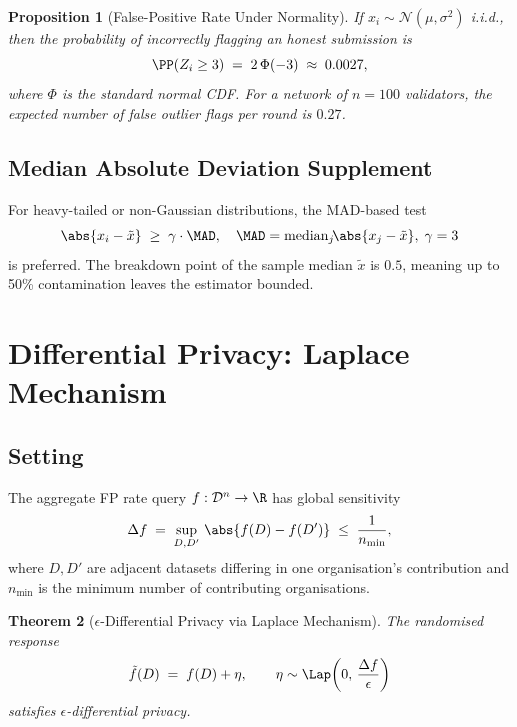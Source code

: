 \documentclass[12pt,a4paper]{article}
\newtheorem{theorem}{Theorem}[section]
\newtheorem{proposition}[theorem]{Proposition}
\theoremstyle{definition}
\theoremstyle{remark}
\begin{document}
\begin{proposition}[False-Positive Rate Under Normality]
If $x_i \sim \mathcal{N}(\mu,\sigma^2)$ i.i.d., then the probability of incorrectly
flagging an honest submission is
\[
  \PP(Z_i \ge 3) \;=\; 2\,\Phi(-3) \;\approx\; 0.0027,
\]
where $\Phi$ is the standard normal CDF.  For a network of $n=100$ validators,
the expected number of false outlier flags per round is $0.27$.
\end{proposition}

\subsection{Median Absolute Deviation Supplement}

For heavy-tailed or non-Gaussian distributions, the MAD-based test
\begin{equation}
  \abs{x_i - \tilde{x}} \;\ge\; \gamma \cdot \MAD, \quad
  \MAD = \mathrm{median}_j\!\abs{x_j - \tilde{x}},\;\gamma=3
  \label{eq:mad}
\end{equation}
is preferred.  The breakdown point of the sample median $\tilde{x}$ is $0.5$,
meaning up to 50\% contamination leaves the estimator bounded.

\section{Differential Privacy: Laplace Mechanism}
\label{sec:dp}

\subsection{Setting}

The aggregate FP rate query $f: \mathcal{D}^n \to \R$ has global sensitivity
\begin{equation}
  \Delta f \;=\; \sup_{D,D'}\,\abs{f(D)-f(D')} \;\le\; \frac{1}{n_{\min}},
  \label{eq:sensitivity}
\end{equation}
where $D,D'$ are adjacent datasets differing in one organisation's contribution
and $n_{\min}$ is the minimum number of contributing organisations.

\begin{theorem}[$\epsilon$-Differential Privacy via Laplace Mechanism]
\label{thm:dp}
The randomised response
\begin{equation}
  \tilde{f}(D) \;=\; f(D) + \eta, \qquad \eta\sim\Lap\!\left(0,\,\frac{\Delta f}{\epsilon}\right)
  \label{eq:laplace}
\end{equation}
satisfies $\epsilon$-differential privacy.
\end{theorem}
\end{document}
